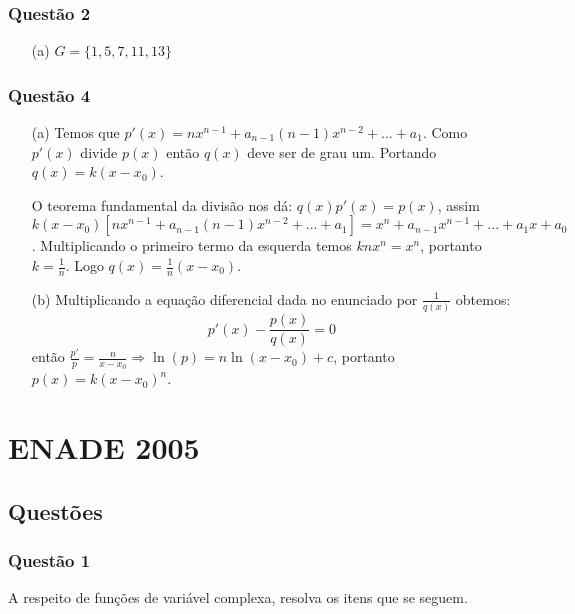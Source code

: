 \documentclass{report}
\begin{document}
\subsection{\color{red} Quest\~ao 2}

\begin{enumerate}

\item[(a)] $G=\{ 1,5,7,11,13 \}$

\end{enumerate}

\subsection{\color{red} Quest\~ao 4}

\begin{enumerate}

\item[(a)] Temos que $p'(x)=nx^{n-1}+a_{n-1}(n-1)x^{n-2}+...+a_1$. Como $p'(x)$ divide $p(x)$ ent\~ao $q(x)$ deve ser de grau um. Portando $q(x)=k(x-x_0)$.

O teorema fundamental da divis\~ao nos d\'a: $q(x)p'(x)=p(x)$, assim $k(x-x_0)[nx^{n-1}+a_{n-1}(n-1)x^{n-2}+...+a_1]=x^n + a_{n-1} x^{n-1} + ... + a_1 x + a_0$. Multiplicando o primeiro termo da esquerda temos $knx^n=x^n$, portanto $k=\frac1{n}$. Logo $q(x)= \frac1{n}(x-x_0)$.

\item[(b)] Multiplicando a equa\c c\~ao diferencial dada no enunciado por $\frac1{q(x)}$ obtemos: $$p'(x)-\frac{p(x)}{q(x)}=0$$ ent\~ao $\frac{p'}{p}=\frac{n}{x-x_0} \Longrightarrow \ln(p)=n\ln(x-x_0)+c$, portanto $p(x)=k(x-x_0)^n$.

\end{enumerate}

\chapter{ENADE 2005}

\section{\color{blue} Quest\~oes}

\subsection{\color{blue} Quest\~ao 1}

A respeito de fun\c c\~oes de vari\'avel complexa, resolva os itens que se seguem.
\end{document}

